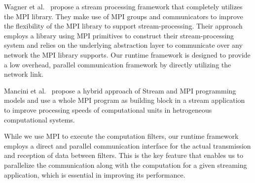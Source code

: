 \documentclass[10pt, conference, compsocconf, reqno]{IEEEtran}
\newcommand{\comment}[1]{}
\begin{document}
Wagner et al.~\cite{5160944} propose a stream processing framework that completely utilizes the MPI library. They make use of MPI groups and communicators to improve the flexibility of the MPI library to support stream-processing. Their approach employs a library using MPI primitives to construct their stream-processing system and relies on the underlying abstraction layer to communicate over any network the MPI library supports. Our runtime framework is designed to provide a low overhead, parallel communication framework by directly utilizing the network link.

Mancini et al.~\cite{5493465} propose a hybrid approach of Stream and MPI programming models and use a whole MPI program as building block in a stream application to improve processing speeds of computational units in hetrogeneous computational systems.

While we use MPI to execute the computation filters, our runtime framework employs a direct and parallel communication interface for the actual transmission and reception of data between filters. This is the key feature that enables us to parallelize the communication along with the computation for a given streaming application, which is essential in improving its performance.

\comment{
Several prior researchers \cite{Dobrescu09routebricks:exploiting}\cite{Han:2010:PGS:1851275.1851207}\cite{Wang:2009:PPN:1542275.1542307}\cite{springerlink:10.1007/s11227-011-0579-3} have worked on using commodity multicore processors to perform network operations.

Dobrescu et al.\cite{Dobrescu09routebricks:exploiting} shows the performance improvement achieved in the construction of software routers by distributing related operations over multiple servers.

Han et al. \cite{Han:2010:PGS:1851275.1851207} perform tasks related to high performance packet processing on commodity hardware using GPUs. They have developed a novel framework known as PacketShader that can do packet processing in user space by exploiting the massively-parallel architecture of GPUs.

Wang et al. \cite{Wang:2009:PPN:1542275.1542307} constructs a high performance connection-affinity based lock-free multicore network processing system that claims to achieve multiple Gbps network processing speed for complex tasks.

Egi et al.\cite{springerlink:10.1007/s11227-011-0579-3} shows techniques on parallelizing network operations on multicore architectures by defining principles that consider multiple resources and not just the CPU alone.
}
\end{document}
